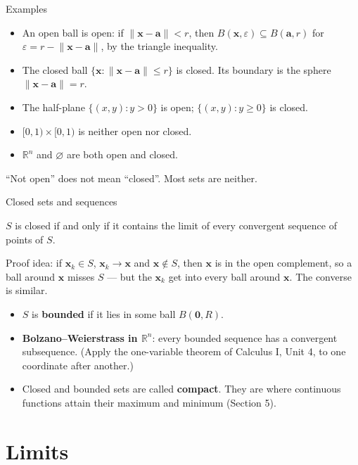 \documentclass[10pt]{wosm-slides}
\newcommand{\R}{\mathbb{R}}
\newcommand{\norm}[1]{\lVert #1 \rVert}
\newcommand{\vx}{\mathbf{x}}
\newcommand{\va}{\mathbf{a}}
\begin{document}
\begin{frame}{Examples}
  \begin{itemize}
    \item An open ball is open: if $\norm{\vx - \va} < r$, then $B(\vx, \varepsilon) \subseteq B(\va, r)$
      for $\varepsilon = r - \norm{\vx - \va}$, by the triangle inequality.
    \item The closed ball $\{\vx : \norm{\vx - \va} \le r\}$ is closed. Its boundary is the sphere
      $\norm{\vx - \va} = r$.
    \item The half-plane $\{(x, y) : y > 0\}$ is open; $\{(x, y) : y \ge 0\}$ is closed.
    \item $[0, 1) \times [0, 1)$ is neither open nor closed.
    \item $\R^n$ and $\varnothing$ are both open and closed.
  \end{itemize}
  \pause
  \begin{warning}
    ``Not open'' does not mean ``closed''. Most sets are neither.
  \end{warning}
\end{frame}

\begin{frame}{Closed sets and sequences}
  \begin{theorem}
    $S$ is closed if and only if it contains the limit of every convergent sequence of points
    of $S$.
  \end{theorem}
  {\small Proof idea: if $\vx_k \in S$, $\vx_k \to \vx$ and $\vx \notin S$, then $\vx$ is in the
  open complement, so a ball around $\vx$ misses $S$ --- but the $\vx_k$ get into every ball
  around $\vx$. The converse is similar.\par}
  \pause
  \begin{itemize}
    \item $S$ is \textbf{bounded} if it lies in some ball $B(\mathbf{0}, R)$.
    \item \textbf{Bolzano--Weierstrass in $\R^n$}: every bounded sequence has a convergent
      subsequence. (Apply the one-variable theorem of Calculus I, Unit 4, to one coordinate after
      another.)
    \item Closed and bounded sets are called \textbf{compact}. They are where continuous functions
      attain their maximum and minimum (Section 5).
  \end{itemize}
\end{frame}

\section{Limits}
\end{document}
